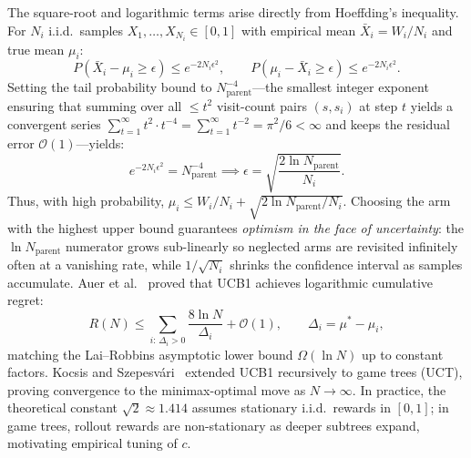 \documentclass[conference]{IEEEtran}
\begin{document}
The square-root and logarithmic terms arise directly from Hoeffding's inequality. For $N_i$ i.i.d.\ samples $X_1, \dots, X_{N_i} \in [0, 1]$ with empirical mean $\bar{X}_i = W_i / N_i$ and true mean $\mu_i$:
\begin{equation}
P(\bar{X}_i - \mu_i \ge \epsilon) \le e^{-2 N_i \epsilon^2}, \qquad
P(\mu_i - \bar{X}_i \ge \epsilon) \le e^{-2 N_i \epsilon^2}.
\end{equation}
Setting the tail probability bound to $N_{\mathrm{parent}}^{-4}$---the smallest integer exponent ensuring that summing over all $\le t^2$ visit-count pairs $(s, s_i)$ at step $t$ yields a convergent series $\sum_{t=1}^{\infty} t^2 \cdot t^{-4} = \sum_{t=1}^{\infty} t^{-2} = \pi^2/6 < \infty$ and keeps the residual error $\mathcal{O}(1)$---yields:
\begin{equation}
e^{-2 N_i \epsilon^2} = N_{\mathrm{parent}}^{-4} \implies \epsilon = \sqrt{\frac{2 \ln N_{\mathrm{parent}}}{N_i}}.
\end{equation}
Thus, with high probability, $\mu_i \le W_i/N_i + \sqrt{2 \ln N_{\mathrm{parent}} / N_i}$. Choosing the arm with the highest upper bound guarantees \emph{optimism in the face of uncertainty}: the $\ln N_{\mathrm{parent}}$ numerator grows sub-linearly so neglected arms are revisited infinitely often at a vanishing rate, while $1/\sqrt{N_i}$ shrinks the confidence interval as samples accumulate. Auer et al.~\cite{auer2002} proved that UCB1 achieves logarithmic cumulative regret:
\begin{equation}
R(N) \le \sum_{i:\,\Delta_i > 0} \frac{8 \ln N}{\Delta_i} + \mathcal{O}(1), \qquad \Delta_i = \mu^* - \mu_i,
\end{equation}
matching the Lai--Robbins asymptotic lower bound $\Omega(\ln N)$ up to constant factors. Kocsis and Szepesv\'ari~\cite{kocsis2006} extended UCB1 recursively to game trees (UCT), proving convergence to the minimax-optimal move as $N \to \infty$. In practice, the theoretical constant $\sqrt{2} \approx 1.414$ assumes stationary i.i.d.\ rewards in $[0, 1]$; in game trees, rollout rewards are non-stationary as deeper subtrees expand, motivating empirical tuning of $c$.
\end{document}
